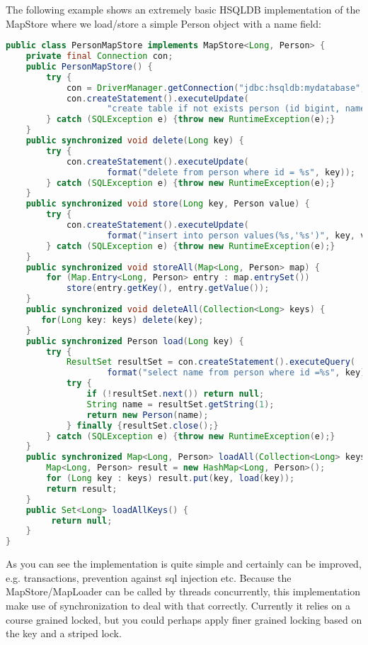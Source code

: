 The following example shows an extremely basic HSQLDB implementation of the MapStore where we load/store a simple Person object with a name field:
\begin{lstlisting}[language=java]
public class PersonMapStore implements MapStore<Long, Person> {
    private final Connection con;
    public PersonMapStore() {
        try {
            con = DriverManager.getConnection("jdbc:hsqldb:mydatabase", "SA", "");
            con.createStatement().executeUpdate(
                    "create table if not exists person (id bigint, name varchar(45))");
        } catch (SQLException e) {throw new RuntimeException(e);}
    }
    public synchronized void delete(Long key) {
        try {
            con.createStatement().executeUpdate(
                    format("delete from person where id = %s", key));
        } catch (SQLException e) {throw new RuntimeException(e);}
    }
    public synchronized void store(Long key, Person value) {
        try {
            con.createStatement().executeUpdate(
                    format("insert into person values(%s,'%s')", key, value.name));
        } catch (SQLException e) {throw new RuntimeException(e);}
    }
    public synchronized void storeAll(Map<Long, Person> map) {
        for (Map.Entry<Long, Person> entry : map.entrySet())
            store(entry.getKey(), entry.getValue());
    }
    public synchronized void deleteAll(Collection<Long> keys) {
       for(Long key: keys) delete(key);
    }
    public synchronized Person load(Long key) {
        try {
            ResultSet resultSet = con.createStatement().executeQuery(
                    format("select name from person where id =%s", key));
            try {
                if (!resultSet.next()) return null;
                String name = resultSet.getString(1);
                return new Person(name);
            } finally {resultSet.close();}
        } catch (SQLException e) {throw new RuntimeException(e);}
    }
    public synchronized Map<Long, Person> loadAll(Collection<Long> keys) {
        Map<Long, Person> result = new HashMap<Long, Person>();
        for (Long key : keys) result.put(key, load(key));
        return result;
    }
    public Set<Long> loadAllKeys() {
         return null;
    }
}
\end{lstlisting}
As you can see the implementation is quite simple and certainly can be improved, e.g. transactions, prevention against sql injection etc. Because the MapStore/MapLoader can be called by threads concurrently, this implementation make use of synchronization to deal with that correctly. Currently it relies on a course grained locked, but you could perhaps apply finer grained locking based on the key and a striped lock.

